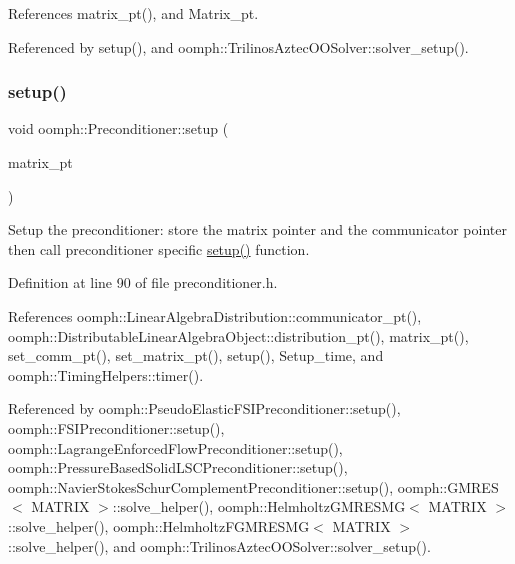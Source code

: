 References matrix\+\_\+pt(), and Matrix\+\_\+pt.



Referenced by setup(), and oomph\+::\+Trilinos\+Aztec\+O\+O\+Solver\+::solver\+\_\+setup().

\mbox{\label{classoomph_1_1Preconditioner_a0b95e7159585b5151f9e5dc1d1713655}} 
\subsubsection{\texorpdfstring{setup()}{setup()}\hspace{0.1cm}{\footnotesize\ttfamily [1/3]}}
{\footnotesize\ttfamily void oomph\+::\+Preconditioner\+::setup (\begin{DoxyParamCaption}\item[{\hyperlink{classoomph_1_1DoubleMatrixBase}{Double\+Matrix\+Base} $\ast$}]{matrix\+\_\+pt }\end{DoxyParamCaption})\hspace{0.3cm}{\ttfamily [inline]}}



Setup the preconditioner\+: store the matrix pointer and the communicator pointer then call preconditioner specific \hyperlink{classoomph_1_1Preconditioner_af4886f4efe510e5c9b0eb19422943588}{setup()} function. 



Definition at line 90 of file preconditioner.\+h.



References oomph\+::\+Linear\+Algebra\+Distribution\+::communicator\+\_\+pt(), oomph\+::\+Distributable\+Linear\+Algebra\+Object\+::distribution\+\_\+pt(), matrix\+\_\+pt(), set\+\_\+comm\+\_\+pt(), set\+\_\+matrix\+\_\+pt(), setup(), Setup\+\_\+time, and oomph\+::\+Timing\+Helpers\+::timer().



Referenced by oomph\+::\+Pseudo\+Elastic\+F\+S\+I\+Preconditioner\+::setup(), oomph\+::\+F\+S\+I\+Preconditioner\+::setup(), oomph\+::\+Lagrange\+Enforced\+Flow\+Preconditioner\+::setup(), oomph\+::\+Pressure\+Based\+Solid\+L\+S\+C\+Preconditioner\+::setup(), oomph\+::\+Navier\+Stokes\+Schur\+Complement\+Preconditioner\+::setup(), oomph\+::\+G\+M\+R\+E\+S$<$ M\+A\+T\+R\+I\+X $>$\+::solve\+\_\+helper(), oomph\+::\+Helmholtz\+G\+M\+R\+E\+S\+M\+G$<$ M\+A\+T\+R\+I\+X $>$\+::solve\+\_\+helper(), oomph\+::\+Helmholtz\+F\+G\+M\+R\+E\+S\+M\+G$<$ M\+A\+T\+R\+I\+X $>$\+::solve\+\_\+helper(), and oomph\+::\+Trilinos\+Aztec\+O\+O\+Solver\+::solver\+\_\+setup().

